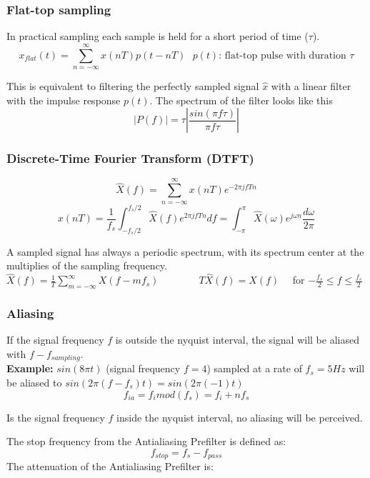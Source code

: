 \begin{center}

\end{center}

\subsubsection{Flat-top sampling }
In practical sampling each sample is held for a short period of time ($\tau$).
\[ x_{flat}(t) =  \sum_{n=-\infty}^{\infty}x(nT)p(t - nT) ~~~ p(t) \text{: flat-top pulse with duration } \tau \]

This is equivalent to filtering the perfectly sampled signal $\hat{x}$ with a linear filter with the impulse response $p(t)$.
The spectrum of the filter looks like this
\[ |P(f)| = \tau \left| \frac{sin(\pi f \tau)}{\pi f \tau} \right| \]

\subsubsection{Discrete-Time Fourier Transform (DTFT)}
\[
	\hat{X}(f) = \sum_{n=-\infty}^{\infty} x(nT)e^{-2\pi jfTn}
\]
\[
	x(nT) = \frac{1}{f_s} \int_{-f_s/2}^{f_s/2}\hat{X}(f)e^{2\pi jfTn}df = \int_{-\pi}^{\pi}\hat{X}(\omega)e^{j\omega n} \frac{d \omega}{2 \pi}
\]

  A sampled signal has always a periodic spectrum, with its spectrum center at the multiplies of the sampling frequency.\\
  $\hat{X}(f) = \frac{1}{T}\sum\limits_{m=-\infty}^{\infty}X(f-mf_s) \qquad \qquad
  T\hat{X}(f) = X(f) \quad$ for $-\frac{f_s}{2} \leq f \leq \frac{f_s}{2}$





\subsubsection{Aliasing}
If the signal frequency $f$ is outside the nyquist interval, the signal will be
aliased with $f - f_{sampling}$.\\
\textbf{Example:} $sin(8\pi t)$ (signal frequency $f=4$) sampled at a rate of
$f_s=5Hz$ will be aliased to $sin(2\pi (f-f_s) t) = sin(2\pi (-1) t)$
\[ f_{ia} = f_i mod (f_s) = f_i + nf_s \]

Is the signal frequency $f$ inside the nyquist interval, no aliasing will be
perceived.

The stop frequency from the Antialiasing Prefilter is defined as:
\[ f_{stop} = f_s - f_{pass} \]
The attenuation of the Antialiasing Prefilter is:


